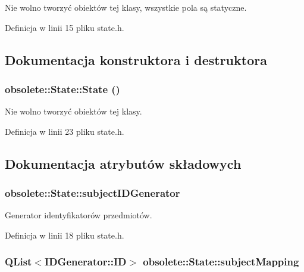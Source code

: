 Nie wolno tworzyć obiektów tej klasy, wszystkie pola są statyczne. 

Definicja w linii 15 pliku state.h.



\subsection{Dokumentacja konstruktora i destruktora}
\hypertarget{classobsolete_1_1State_ac8dd10c3b5045899fc6095b1c79d27d1}{
\subsubsection[{State}]{\setlength{\rightskip}{0pt plus 5cm}obsolete::State::State ()}}
\label{classobsolete_1_1State_ac8dd10c3b5045899fc6095b1c79d27d1}


Nie wolno tworzyć obiektów tej klasy. 



Definicja w linii 23 pliku state.h.



\subsection{Dokumentacja atrybutów składowych}
\hypertarget{classobsolete_1_1State_a79baf22dac86724b99d4b2b785e38875}{
\subsubsection[{subjectIDGenerator}]{ {\bf obsolete::State::subjectIDGenerator}}}
\label{classobsolete_1_1State_a79baf22dac86724b99d4b2b785e38875}


Generator identyfikatorów przedmiotów. 



Definicja w linii 18 pliku state.h.

\hypertarget{classobsolete_1_1State_acbed5e9ef96a7bf365f2429e1384bd03}{
\subsubsection[{subjectMapping}]{\setlength{\rightskip}{0pt plus 5cm}QList$<${\bf IDGenerator::ID}$>$ {\bf obsolete::State::subjectMapping}}}
\label{classobsolete_1_1State_acbed5e9ef96a7bf365f2429e1384bd03}


